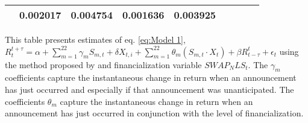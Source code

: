 \begin{sidewaystable}
{\begin{tabular}{@{}lllllllllllll@{}}
                                & \multicolumn{2}{c}{ 0.002017 }                                                 & \multicolumn{2}{c}{ 0.004754 }                                                 & \multicolumn{2}{c}{ 0.001636 }                                                   & \multicolumn{2}{c}{ 0.003925 }                                                 \\ \bottomrule 
\end{tabular}
}
\begin{tablenotes}\item 
    \singlespacing
    \footnotesize
    This table presents estimates of eq. \ref{eq:Model 1}, $R_{t}^{t+\tau}=\alpha+\sum_{m=1}^{22} \gamma_m S_{m,t}+ \delta X_{t,i} + \sum_{m=1}^{22} \theta_m (S_{m,t} \cdot X_t)+\beta R_{t-\tau}^{t}+\epsilon_{t}$ using the method proposed by \citet{kurov2019price} and financialization variable $SWAP_NLS_t$. The $\gamma_m$ coefficients capture the instantaneous change in return when an announcement has just occurred and especially if that announcement was unanticipated. The coefficients $\theta_m$ capture the instantaneous change in return when an announcement has just occurred in conjunction with the level of financialization.
\end{tablenotes}
\end{sidewaystable}
